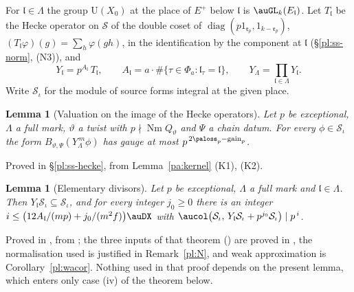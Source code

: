 \documentclass[10pt]{amsart}
\newtheorem{lemma}[theorem]{Lemma}
\theoremstyle{definition}
\theoremstyle{remark}
\providecommand{\auNm}{\operatorname{Nm}}
\providecommand{\auPa}{\Phi_a}
\providecommand{\auS}{\mathcal S}
\providecommand{\auU}{\mathrm U}
\providecommand{\augain}{\operatorname{gain}}
\begin{document}
For $\mathfrak l\in\Lambda$ the group $\auU(X_0)$ at the place of $E^+$ below $\mathfrak l$ is
$\auGL_k(E_{\mathfrak l})$. Let $T_{\mathfrak l}$ be the Hecke operator on $\auS$ of the double coset of
$\operatorname{diag}(p1_{\mathfrak r_p},1_{k-\mathfrak r_p})$, $(T_{\mathfrak l}\varphi)(g)=\sum_h
\varphi(gh)$, in the identification by the component at $\mathfrak l$ (\S\ref{pl:ss-norm}, (N3)), and
\[
Y_{\mathfrak l}=p^{A_{\mathfrak l}}\,T_{\mathfrak l},\qquad
A_{\mathfrak l}=a\cdot\#\{\tau\in\auPa:\mathfrak l_\tau=\mathfrak l\},\qquad
Y_\Lambda=\prod_{\mathfrak l\in\Lambda}Y_{\mathfrak l}.
\]
Write $\auS_\iota$ for the module of source forms integral at the given place.

\begin{lemma}[Valuation on the image of the Hecke operators]\label{pa:hecke}
Let $p$ be exceptional, $\Lambda$ a full mark, $\vartheta$ a twist with $p\nmid\auNm Q_\vartheta$
and $\Psi$ a chain datum. For every $\phi\in\auS_\iota$ the form
$B_{\vartheta,\Psi}(Y_\Lambda^{\,m}\phi)$ has gauge at most $p^{\,2\paloss_p-\augain_p}$.
\end{lemma}
\noindent Proved in \S\ref{pl:ss-hecke}, from Lemma~\ref{pa:kernel} (K1), (K2).

\begin{lemma}[Elementary divisors]\label{pa:eldiv}
Let $p$ be exceptional, $\Lambda$ a full mark and $\mathfrak l\in\Lambda$. Then
$Y_{\mathfrak l}\auS_\iota\subseteq\auS_\iota$, and for every integer $j_0\ge0$ there is an integer
$i\le\bigl(12A_{\mathfrak l}/(mp)+j_0/(m^2f)\bigr)\auDX$ with
$\aucol\bigl(\auS_\iota,\,Y_{\mathfrak l}\auS_\iota+p^{j_0}\auS_\iota\bigr)\mid p^{\,i}$.
\end{lemma}
\noindent Proved in {\cite[\S2.7]{P50}}, from {\cite[Theorem~2.2]{P50}}; the three inputs of that theorem
({\cite[Propositions~2.10, 2.12 and~2.13]{P50}}) are proved in {\cite[\S3]{P50}}, the
normalisation used is justified in Remark~\ref{pl:N}, and weak approximation is
Corollary~\ref{pl:wacor}. Nothing used in that proof depends on the present lemma, which enters only case (iv) of the theorem below.
\end{document}
